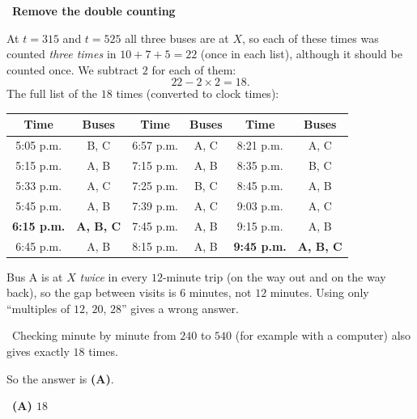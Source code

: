 \documentclass[11pt]{article}
\providecommand{\AnsWord}{Đáp số}
\newcommand{\ans}[1]{\par\smallskip{\bfseries\color{tmGreen!88!black}\AnsWord:}\ {\bfseries\color{AnsRed}#1}\par}
\newcommand{\step}[2]{\par\smallskip\noindent{\bfseries\color{tmBlue!85!black}\StepWord~#1.}\ {\bfseries #2}\par\nopagebreak}
\newcommand{\verify}[1]{\par\smallskip\noindent{\bfseries\color{tmGreen!80!black}\faCheckCircle\ \CheckWord}\ #1\par}
\def\AnsWord{Answer}
\def\StepWord{Step}
\def\CheckWord{Check:}
\begin{document}
{\step{5}{Remove the double counting}
At $t=315$ and $t=525$ all three buses are at $X$, so each of these times was counted \emph{three times} in $10+7+5=22$ (once in each list), although it should be counted once. We subtract $2$ for each of them:
\[ 22-2\times 2=18. \]
The full list of the $18$ times (converted to clock times):
\begin{center}\small
\begin{tabular}{|c|c||c|c||c|c|}
\hline
\rowcolor{tmBlue!10}Time & Buses & Time & Buses & Time & Buses\\ \hline
5:05 p.m. & B, C & 6:57 p.m. & A, C & 8:21 p.m. & A, C\\ \hline
5:15 p.m. & A, B & 7:15 p.m. & A, B & 8:35 p.m. & B, C\\ \hline
5:33 p.m. & A, C & 7:25 p.m. & B, C & 8:45 p.m. & A, B\\ \hline
5:45 p.m. & A, B & 7:39 p.m. & A, C & 9:03 p.m. & A, C\\ \hline
\textbf{6:15 p.m.} & \textbf{A, B, C} & 7:45 p.m. & A, B & 9:15 p.m. & A, B\\ \hline
6:45 p.m. & A, B & 8:15 p.m. & A, B & \textbf{9:45 p.m.} & \textbf{A, B, C}\\ \hline
\end{tabular}
\end{center}
\begin{warnbox}Bus A is at $X$ \emph{twice} in every $12$-minute trip (on the way out and on the way back), so the gap between visits is $6$ minutes, not $12$ minutes. Using only ``multiples of $12$, $20$, $28$'' gives a wrong answer.\end{warnbox}
\verify{Checking minute by minute from $240$ to $540$ (for example with a computer) also gives exactly $18$ times.}
So the answer is \textbf{(A)}.
\ans{(A) $18$}
}
\end{document}
